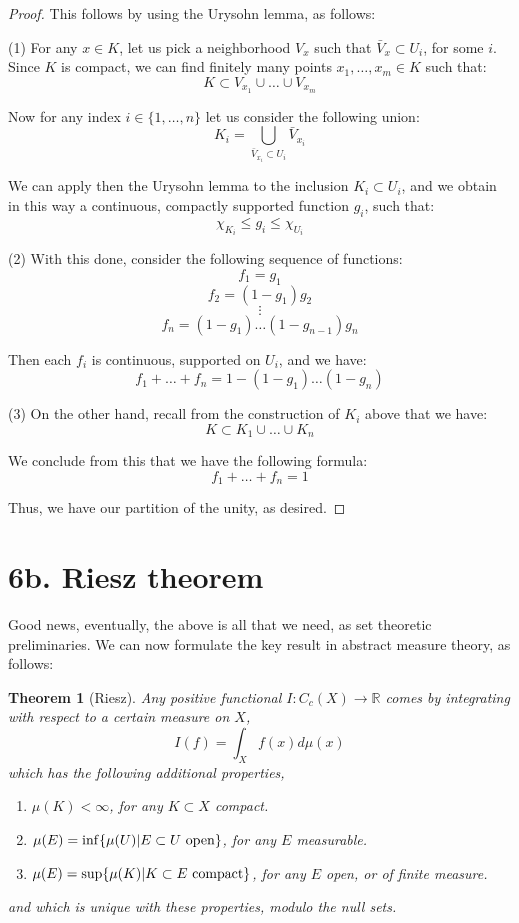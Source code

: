 \documentclass[12pt]{amsbook}
\newtheorem{theorem}{Theorem}[chapter]
\begin{document}
\begin{proof}
This follows by using the Urysohn lemma, as follows:

\medskip

(1) For any $x\in K$, let us pick a neighborhood $V_x$ such that $\bar{V}_x\subset U_i$, for some $i$. Since $K$ is compact, we can find finitely many points $x_1,\ldots,x_m\in K$ such that:
$$K\subset V_{x_1}\cup\ldots\cup V_{x_m}$$

Now for any index $i\in\{1,\ldots,n\}$ let us consider the following union:
$$K_i=\bigcup_{\bar{V}_{x_i}\subset U_i}\bar{V}_{x_i}$$

We can apply then the Urysohn lemma to the inclusion $K_i\subset U_i$, and we obtain in this way a continuous, compactly supported function $g_i$, such that:
$$\chi_{K_i}\leq g_i\leq\chi_{U_i}$$

(2) With this done, consider the following sequence of functions:
$$f_1=g_1$$
$$f_2=(1-g_1)g_2$$
$$\vdots$$
$$f_n=(1-g_1)\ldots(1-g_{n-1})g_n$$

Then each $f_i$ is continuous, supported on $U_i$, and we have:
$$f_1+\ldots+f_n=1-(1-g_1)\ldots(1-g_n)$$

(3) On the other hand, recall from the construction of $K_i$ above that we have:
$$K\subset K_1\cup\ldots\cup K_n$$

We conclude from this that we have the following formula:
$$f_1+\ldots+f_n=1$$

Thus, we have our partition of the unity, as desired.
\end{proof}

\section*{6b. Riesz theorem}

Good news, eventually, the above is all that we need, as set theoretic preliminaries. We can now formulate the key result in abstract measure theory, as follows:

\begin{theorem}[Riesz]
Any positive functional $I:C_c(X)\to\mathbb R$ comes by integrating with respect to a certain measure on $X$,
$$I(f)=\int_Xf(x)d\mu(x)$$
which has the following additional properties,
\begin{enumerate}
\item $\mu(K)<\infty$, for any $K\subset X$ compact.

\item $\mu(E)=\inf\{\mu(U)|E\subset U\ {\rm open}\}$, for any $E$ measurable.

\item $\mu(E)=\sup\{\mu(K)|K\subset E\ {\rm compact}\}$, for any $E$ open, or of finite measure.
\end{enumerate}
and which is unique with these properties, modulo the null sets.
\end{theorem}
\end{document}
